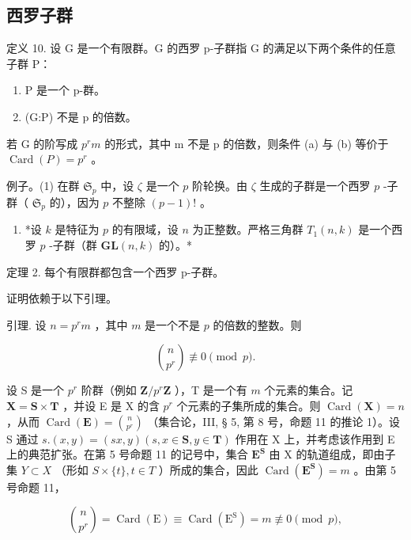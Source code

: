 \subsection{西罗子群}

定义 10. 设 G 是一个有限群。G 的西罗 p-子群指 G 的满足以下两个条件的任意子群 P：

\begin{enumerate}
\def\labelenumi{(\alph{enumi})}
\item
  P 是一个 p-群。
\item
  (G:P) 不是 p 的倍数。
\end{enumerate}

若 G 的阶写成 \(p^{r}m\) 的形式，其中 m 不是 p 的倍数，则条件 (a) 与 (b) 等价于 \(\operatorname{Card}(P) = p^{r}\) 。

例子。(1) 在群 \(\mathfrak{S}_p\) 中，设 \(\zeta\) 是一个 \(p\) 阶轮换。由 \(\zeta\) 生成的子群是一个西罗 \(p\) -子群（ \(\mathfrak{S}_p\) 的），因为 \(p\) 不整除 \((p - 1)!\) 。

\begin{enumerate}
\def\labelenumi{(\arabic{enumi})}
\setcounter{enumi}{1}
\tightlist
\item
  *设 \(k\) 是特征为 \(p\) 的有限域，设 \(n\) 为正整数。严格三角群 \(T_1(n, k)\) 是一个西罗 \(p\) -子群（群 \(\mathbf{GL}(n, k)\) 的）。*
\end{enumerate}

定理 2. 每个有限群都包含一个西罗 p-子群。

证明依赖于以下引理。

引理. 设 \(n = p^r m\) ，其中 \(m\) 是一个不是 \(p\) 的倍数的整数。则

\[
\binom {n} {p ^ {r}} \not \equiv 0 \pmod {p}.
\]

设 S 是一个 \(p^r\) 阶群（例如 \(\mathbf{Z} / p^r\mathbf{Z}\) ），T 是一个有 \(m\) 个元素的集合。记 \(\mathbf{X} = \mathbf{S} \times \mathbf{T}\) ，并设 E 是 X 的含 \(p^r\) 个元素的子集所成的集合。则 \(\operatorname{Card}(\mathbf{X}) = n\) ，从而 \(\operatorname{Card}(\mathbf{E}) = \binom{n}{p^r}\) （集合论，III, § 5, 第 8 号，命题 11 的推论 1）。设 S 通过 \(s.(x,y) = (sx,y)(s,x \in \mathbf{S},y \in \mathbf{T})\) 作用在 X 上，并考虑该作用到 E 上的典范扩张。在第 5 号命题 11 的记号中，集合 \(\mathbf{E}^{\mathbf{S}}\) 由 X 的轨道组成，即由子集 \(Y \subset X\) （形如 \(S \times \{t\}, t \in T\) ）所成的集合，因此 \(\operatorname{Card}(\mathbf{E}^{\mathbf{S}}) = m\) 。由第 5 号命题 11，

\[
\binom {n} {p ^ {r}} = \operatorname{Card} (\mathrm{E}) \equiv \operatorname{Card} (\mathrm{E} ^ {\mathrm{S}}) = m \not \equiv 0 \pmod {p},
\]

